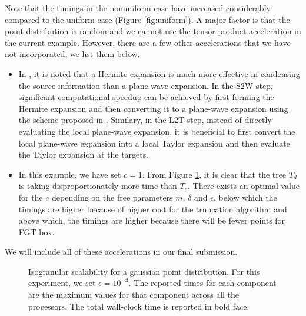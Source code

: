Note that the timings in the nonuniform case have increased considerably compared to the uniform case (Figure \ref{fig:uniform}). A major factor is that the point distribution is random and we cannot use the tensor-product acceleration in the current example. However, there are a few other accelerations that we have not incorporated, we list them below.
%
\begin{itemize}
  \item In \cite{fggt}, it is noted that a Hermite expansion is much more effective in condensing the source information than a plane-wave expansion. In the S2W step, significant computational speedup can be achieved by first forming the Hermite expansion and then converting it to a plane-wave expansion using the scheme proposed in \cite{fggt}. Similary, in the L2T step, instead of directly evaluating the local plane-wave expansion, it is beneficial to first convert the local plane-wave expansion into a local Taylor expansion and then evaluate the Taylor expansion at the targets. 
  \item In this example, we have set $c = 1$. From Figure \ref{fig:nonuniform}, it is clear that the tree $T_d$ is taking disproportionately more time than $T_e$. There exists an optimal value for the $c$ depending on the free parameters $m$, $\delta$ and $\epsilon$, below which the timings are higher because of higher cost for the truncation algorithm and above which, the timings are higher because there will be fewer points for FGT box.
\end{itemize}
%
We will include all of these accelerations in our final submission. 

\begin{figure}
	\begin{center}
	
	\end{center}
\caption{\label{f:isoGaussian} Isogranular scalability for a gaussian point distribution. For
 this experiment, we set $\epsilon = 10^{-3}$. The reported times for each component are the
 maximum values for that component across all the processors. The total wall-clock
time is reported in bold face.} \label{fig:nonuniform}
\end{figure}
